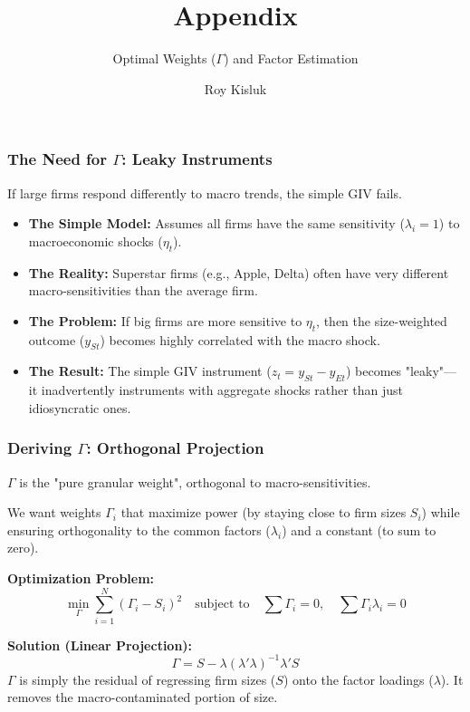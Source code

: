 \documentclass[aspectratio=169,11pt]{beamer}
\begin{document}
\begin{frame}
    \title{Appendix}
    \subtitle{Optimal Weights ($\Gamma$) and Factor Estimation}
    \author{Roy Kisluk}
    \date{}
    \titlepage
\end{frame}

\begin{frame}
    \frametitle{The Need for $\Gamma$: Leaky Instruments}
    
    \vspace{0.5cm}
    {\Large
        If large firms respond differently to macro trends, the simple GIV fails.
    }
    
    \vspace{1cm}
    \begin{itemize}
        \item \textbf{The Simple Model:} Assumes all firms have the same sensitivity ($\lambda_i = 1$) to macroeconomic shocks ($\eta_t$).
        \item \textbf{The Reality:} Superstar firms (e.g., Apple, Delta) often have very different macro-sensitivities than the average firm.
        \item \textbf{The Problem:} If big firms are more sensitive to $\eta_t$, then the size-weighted outcome ($y_{St}$) becomes highly correlated with the macro shock.
        \item \textbf{The Result:} The simple GIV instrument ($z_t = y_{St} - y_{Et}$) becomes "leaky"—it inadvertently instruments with aggregate shocks rather than just idiosyncratic ones.
    \end{itemize}
\end{frame}

\begin{frame}[shrink=20]
    \frametitle{Deriving $\Gamma$: Orthogonal Projection}
    
    \vspace{0.5cm}
    {\Large
        $\Gamma$ is the "pure granular weight", orthogonal to macro-sensitivities.
    }
    
    \vspace{0.5cm}
    We want weights $\Gamma_i$ that maximize power (by staying close to firm sizes $S_i$) while ensuring orthogonality to the common factors ($\lambda_i$) and a constant (to sum to zero).
    
    \vspace{0.5cm}
    \textbf{Optimization Problem:}
    \begin{equation*}
        \min_{\Gamma} \sum_{i=1}^N (\Gamma_i - S_i)^2 \quad \text{subject to} \quad \sum \Gamma_i = 0, \quad \sum \Gamma_i \lambda_i = 0
    \end{equation*}
    
    \vspace{0.5cm}
    \textbf{Solution (Linear Projection):}
    \begin{equation*}
        \Gamma = S - \lambda (\lambda' \lambda)^{-1} \lambda' S
    \end{equation*}
    \vspace{0.2cm}
    $\Gamma$ is simply the residual of regressing firm sizes ($S$) onto the factor loadings ($\lambda$). It removes the macro-contaminated portion of size.
\end{frame}
\end{document}
